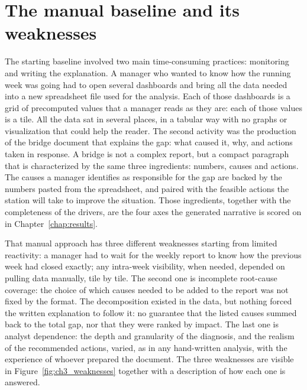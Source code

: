 \documentclass[12pt,a4paper,openright,twoside]{book}
\begin{document}
\section{The manual baseline and its weaknesses}
The starting baseline involved two main time-consuming practices: monitoring and writing the explanation.
A manager who wanted to know how the running week was going had to open several dashboards and bring all the data needed into a new spreadsheet file used for the analysis.
Each of those dashboards is a grid of precomputed values that a manager reads as they are: each of those values is a tile.
All the data sat in several places, in a tabular way with no graphs or visualization that could help the reader.
The second activity was the production of the bridge document that explains the gap: what caused it, why, and actions taken in response.
A bridge is not a complex report, but a compact paragraph that is characterized by the same three ingredients: numbers, causes and actions.
The causes a manager identifies as responsible for the gap are backed by the numbers pasted from the spreadsheet, and paired with the feasible actions the station will take to improve the situation.
Those ingredients, together with the completeness of the drivers, are the four axes the generated narrative is scored on in Chapter~\ref{chap:results}.


That manual approach has three different weaknesses starting from limited reactivity: a manager had to wait for the weekly report to know how the previous week had closed exactly; any intra-week visibility, when needed, depended on pulling data manually, tile by tile.
The second one is incomplete root-cause coverage: the choice of which causes needed to be added to the report was not fixed by the format. 
The decomposition existed in the data, but nothing forced the written explanation to follow it: no guarantee that the listed causes summed back to the total gap, nor that they were ranked by impact.
The last one is analyst dependence: the depth and granularity of the diagnosis, and the realism of the recommended actions, varied, as in any hand-written analysis, with the experience of whoever prepared the document.
The three weaknesses are visible in Figure~\ref{fig:ch3_weaknesses} together with a description of how each one is answered.
\end{document}
